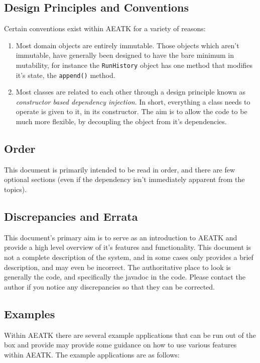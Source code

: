 \documentclass[11pt,letterpaper,oneside]{article}
\begin{document}
\subsection{Design Principles and Conventions}
\label{sec:design-principles}
Certain conventions exist within AEATK for a variety of reasons:

\begin{enumerate}

\item Most domain objects are entirely immutable. Those objects which aren't immutable, have generally been designed to have the bare minimum in mutability, for instance the \texttt{RunHistory} object has one method that modifies it's state, the \texttt{append()} method.

\item Most classes are related to each other through a design principle known as \emph{constructor based dependency injection}. In short, everything a class needs to operate is given to it, in its constructor. The aim is to allow the code to be much more flexible, by decoupling the object from it's dependencies. 

\end{enumerate}

\subsection{Order}

This document is primarily intended to be read in order, and there are few optional sections (even if the dependency isn't immediately apparent from the topics).

\subsection{Discrepancies and Errata}

This document's primary aim is to serve as an introduction to AEATK and provide a high level overview of it's features and functionality. This document is not a complete description of the system, and in some cases only provides a brief description, and may even be incorrect. The authoritative place to look is generally the code, and specifically the javadoc in the code. Please contact the author if you notice any discrepancies so that they can be corrected.

\subsection{Examples}
\label{sec:examples}
Within AEATK there are several example applications that can be run out of the box and provide may provide some guidance on how to use various features within AEATK. The example applications are as follows:
\end{document}
